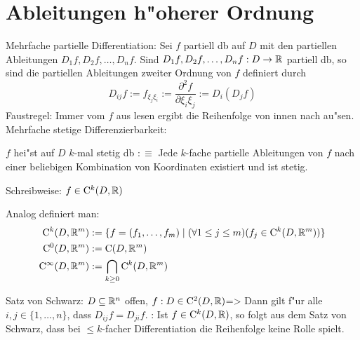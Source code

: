 \section{Ableitungen h"oherer Ordnung}
 Mehrfache partielle Differentiation:{
  Sei $f$ partiell db auf $D$ mit den partiellen Ableitungen
  $D_1f,D_2f,\ldots,D_nf$. Sind $D_1f,D_2f,\ldots,D_nf:D\to\mathbb R$
  partiell db, so sind die partiellen Ableitungen zweiter Ordnung von $f$
  definiert durch
  \[D_{ij}f:=f_{\xi_j\xi_i}:=\frac{\partial^2 f}{\partial \xi_i \xi_j}:=
    D_i(D_jf)
    \]
  Faustregel: Immer vom $f$ aus lesen ergibt die Reihenfolge von innen nach au"sen.
  }
 Mehrfache stetige Differenzierbarkeit:{
  $f$ hei"st auf $D$ $k$-mal stetig db $:\equiv$
  Jede $k$-fache partielle Ableitungen von $f$ nach einer beliebigen
  Kombination von Koordinaten existiert und ist stetig.
  
  Schreibweise: $f\in{\rm C}^k(D,\mathbb R)$
  
  Analog definiert man:
  \begin{align*}
    {\rm C}^k(D,\mathbb R^m)&:=\{f=(f_1,\ldots,f_m) \mid 
      (\forall 1\leq j\leq m)(f_j\in{\rm C}^k(D,\mathbb R^m))\} \\
    {\rm C}^0(D,\mathbb R^m)&:={\rm C}(D,\mathbb R^m) \\
    {\rm C}^\infty(D,\mathbb R^m)&:=\bigcap_{k\geq 0} {\rm C}^k(D,\mathbb R^m)
    \end{align*}
  }
\theorem Satz von Schwarz:
  $D\subseteq\mathbb R^n$ offen, $f:D\in{\rm C}^2(D,\mathbb R)$=>{
  Dann gilt f"ur alle $i,j\in\{1,\ldots,n\}$, dass $D_{ij}f=D_{ji}f$.
  }
\remark:{
  Ist $f\in{\rm C}^k(D,\mathbb R)$, so folgt aus dem Satz von Schwarz, dass
  bei $\leq k$-facher Differentiation die Reihenfolge keine Rolle spielt.
  }
